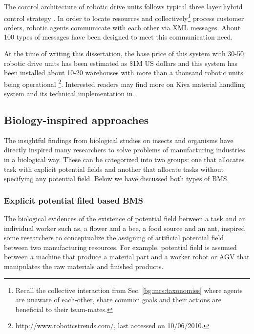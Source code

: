 The control architecture of robotic drive units follows typical three layer hybrid control strategy \cite{Simmons+2002}. In order to locate resources and collectively\footnote{Recall the collective interaction  from Sec. \ref{bg:mrs:taxonomies} where agents are unaware of each-other, share common goals and their actions are beneficial to their team-mates.} process customer orders, robotic agents communicate with each other via XML messages. About 100 types of messages have been designed to meet this communication need.

At the  time of writing this dissertation,  the base price of this system with 30-50 robotic drive units has been estimated as \$1M US dollars and this system has been installed about 10-20 warehouses with more than a thousand robotic units being operational \footnote{http://www.roboticstrends.com/, last accessed on 10/06/2010.}.  Interested readers may find more on Kiva material handling system and its technical implementation in .
\subsection{Biology-inspired approaches}
The insightful findings from biological studies on insects and organisms have directly inspired many researchers to solve problems of manufacturing industries in a biological way. These can be categorized into two groups: one that allocates task with explicit  potential fields and another that allocate tasks without specifying any potential field. Below we have discussed both types of \acf{BMS}.
\subsubsection*{Explicit potential filed based BMS}
The biological evidences of the existence of potential field between a task and an individual worker such as, a flower and a bee, a food source and an ant, inspired some researchers to conceptualize the assigning of artificial potential field between two manufacturing resources. For example, potential field is assumed between a machine that produce a material part and a worker robot or AGV that manipulates the raw materials and finished products.

